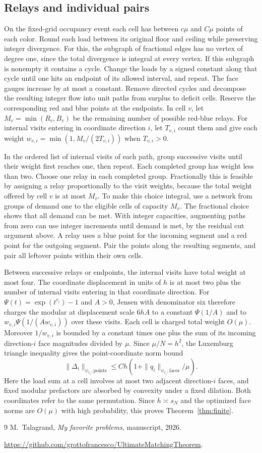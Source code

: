 \documentclass[11pt]{article}
\begin{document}
\subsection*{Relays and individual pairs}
On the fixed-grid occupancy event each cell has between
\(c\mu\) and \(C\mu\) points of each color. Round each load
between its original floor and ceiling while preserving integer
divergence. For this, the subgraph of fractional edges has no
vertex of degree one, since the total divergence is integral
at every vertex. If this subgraph is nonempty it contains a
cycle. Change the loads by a signed constant along that cycle
until one hits an endpoint of its allowed interval, and repeat.
The face gauges increase by at most a constant. Remove directed cycles and decompose
the resulting integer flow into unit paths from surplus
to deficit cells. Reserve the corresponding red and blue
points at the endpoints. In cell \(v\), let
\(M_v=\min(R_v,B_v)\) be the remaining number of possible
red-blue relays. For internal visits entering in coordinate
direction \(i\), let \(T_{v,i}\) count them and give each
weight \(w_{v,i}=\min(1,M_v/(2T_{v,i}))\) when \(T_{v,i}>0\).

In the ordered list of internal visits of each path, group
successive visits until their weight first reaches one,
then repeat. Each completed group has weight less than two.
Choose one relay in each completed group. Fractionally this
is feasible by assigning a relay proportionally to the visit
weights, because the total weight offered by cell \(v\) is
at most \(M_v\). To make this choice integral, use a network
from groups of demand one to the eligible cells of capacity
\(M_v\). The fractional choice shows that all demand can
be met. With integer capacities, augmenting paths from
zero can use integer increments until demand is met,
by the residual cut argument above. A relay uses a blue point for the incoming
segment and a red point for the outgoing segment.
Pair the points along the resulting segments, and pair
all leftover points within their own cells.

Between successive relays or endpoints, the internal visits
have total weight at most four. The coordinate displacement
in units of \(h\) is at most two plus the number of internal
visits entering in that coordinate direction.
For \(\Psi(t)=\exp(t^{r_i})-1\) and \(A>0\), Jensen with denominator six
therefore charges the modular at displacement scale \(6hA\)
to a constant \(\Psi(1/A)\) and to
\(w_{v,i}\Psi(1/(Aw_{v,i}))\) over these visits.
Each cell is charged total weight \(O(\mu)\).
Moreover \(1/w_{v,i}\) is bounded by a constant times one
plus the sum of its incoming direction-\(i\) face magnitudes
divided by \(\mu\). Since \(\mu/N=h^2\), the Luxemburg
triangle inequality gives the point-coordinate norm bound
\[
 \|\Delta_i\|_{\psi_{r_i},\mathrm{points}}
 \le C h(1+\|q_i\|_{\psi_{r_i},\mathrm{faces}}/\mu).
\]
Here the load sum at a cell involves at most two adjacent
direction-\(i\) faces, and fixed modular prefactors are
absorbed by convexity under a fixed dilation. Both coordinates
refer to the same permutation. Since \(h\asymp s_N\) and the
optimized face norms are \(O(\mu)\) with high probability,
this proves Theorem~\ref{thm:finite}.

\begin{thebibliography}{9}
M.~Talagrand, \emph{My favorite problems}, manuscript, 2026.

\url{https://github.com/grottofrancesco/UltimateMatchingTheorem}.
\end{thebibliography}
\end{document}
